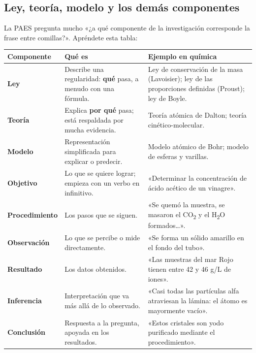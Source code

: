 \subsection{Ley, teoría, modelo y los demás componentes}
La PAES pregunta mucho «¿a qué componente de la investigación corresponde la frase entre comillas?». Apréndete esta tabla:

 
\begin{center}\small
\begin{tabularx}{\linewidth}{@{}>{\raggedright\arraybackslash\hsize=0.50\hsize}X>{\raggedright\arraybackslash\hsize=1.25\hsize}X>{\raggedright\arraybackslash\hsize=1.25\hsize}X@{}}
\toprule
\textbf{Componente} & \textbf{Qué es} & \textbf{Ejemplo en química} \\
\midrule
\textbf{Ley} & Describe una regularidad: \textbf{qué} pasa, a menudo con una fórmula. & Ley de conservación de la masa (Lavoisier); ley de las proporciones definidas (Proust); ley de Boyle. \\
\textbf{Teoría} & Explica \textbf{por qué} pasa; está respaldada por mucha evidencia. & Teoría atómica de Dalton; teoría cinético-molecular. \\
\textbf{Modelo} & Representación simplificada para explicar o predecir. & Modelo atómico de Bohr; modelo de esferas y varillas. \\
\textbf{Objetivo} & Lo que se quiere lograr; empieza con un verbo en infinitivo. & «Determinar la concentración de ácido acético de un vinagre». \\
\textbf{Procedimiento} & Los pasos que se siguen. & «Se quemó la muestra, se masaron el CO\textsubscript{2} y el H\textsubscript{2}O formados\dots{}». \\
\textbf{Observación} & Lo que se percibe o mide directamente. & «Se forma un sólido amarillo en el fondo del tubo». \\
\textbf{Resultado} & Los datos obtenidos. & «Las muestras del mar Rojo tienen entre 42 y 46 g/L de iones». \\
\textbf{Inferencia} & Interpretación que va más allá de lo observado. & «Casi todas las partículas alfa atraviesan la lámina: el átomo es mayormente vacío». \\
\textbf{Conclusión} & Respuesta a la pregunta, apoyada en los resultados. & «Estos cristales son yodo purificado mediante el procedimiento». \\
\bottomrule
\end{tabularx}
\end{center}
  
